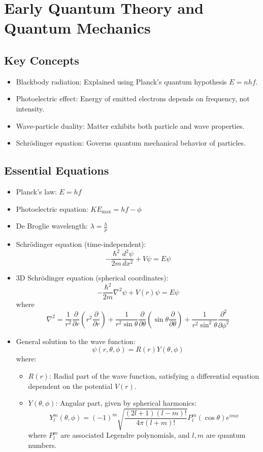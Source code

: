 \documentclass{article}
\newcommand{\eqbox}[1]{\begin{tcolorbox}[colback=gray!10] #1 \end{tcolorbox}}
\newcommand{\conceptbox}[1]{\begin{tcolorbox}[colback=blue!10] #1 \end{tcolorbox}}
\begin{document}
\section{Early Quantum Theory and Quantum Mechanics}

\subsection{Key Concepts}
\conceptbox{
\begin{itemize}
    \item Blackbody radiation: Explained using Planck's quantum hypothesis $E = nhf$.
    \item Photoelectric effect: Energy of emitted electrons depends on frequency, not intensity.
    \item Wave-particle duality: Matter exhibits both particle and wave properties.
    \item Schr\"odinger equation: Governs quantum mechanical behavior of particles.
\end{itemize}
}

\subsection{Essential Equations}
\eqbox{
\begin{itemize}
    \item Planck's law: $E = hf$
    \item Photoelectric equation: $KE_{\text{max}} = hf - \phi$
    \item De Broglie wavelength: $\lambda = \frac{h}{p}$
    \item Schrödinger equation (time-independent): 
    \[
    -\frac{\hbar^2}{2m}\frac{d^2\psi}{dx^2} + V\psi = E\psi
    \]
    \item 3D Schrödinger equation (spherical coordinates):
    \[
    -\frac{\hbar^2}{2m} \nabla^2 \psi + V(r)\psi = E\psi
    \]
    where 
    \[
    \nabla^2 = \frac{1}{r^2} \frac{\partial}{\partial r} \left( r^2 \frac{\partial}{\partial r} \right) 
    + \frac{1}{r^2 \sin\theta} \frac{\partial}{\partial \theta} \left( \sin\theta \frac{\partial}{\partial \theta} \right) 
    + \frac{1}{r^2 \sin^2\theta} \frac{\partial^2}{\partial \phi^2}
    \]
    \item General solution to the wave function:
    \[
    \psi(r, \theta, \phi) = R(r) Y(\theta, \phi)
    \]
    where:
    \begin{itemize}
        \item $R(r)$: Radial part of the wave function, satisfying a differential equation dependent on the potential $V(r)$.
        \item $Y(\theta, \phi)$: Angular part, given by spherical harmonics:
        \[
        Y_l^m(\theta, \phi) = (-1)^m \sqrt{\frac{(2l+1)(l-m)!}{4\pi (l+m)!}} P_l^m(\cos\theta)e^{im\phi}
        \]
        where $P_l^m$ are associated Legendre polynomials, and $l, m$ are quantum numbers.
    \end{itemize}
\end{itemize}
}
\end{document}
